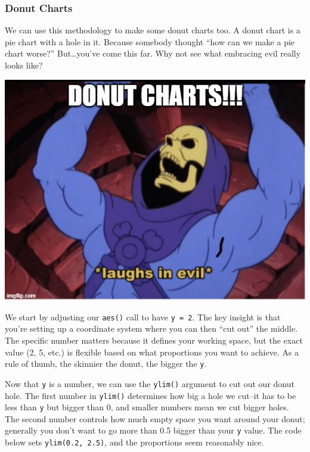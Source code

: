 \documentclass[
  letterpaper,
]{book}
\begin{document}
\subsubsection{Donut Charts}\label{donut-charts}

We can use this methodology to make some donut charts too. A donut chart
is a pie chart with a hole in it. Because somebody thought ``how can we
make a pie chart worse?'' But\ldots you've come this far. Why not see
what embracing evil really looks like?

\begin{center}
\includegraphics[width=0.6\linewidth,height=\textheight,keepaspectratio]{images/donut.jpg}
\end{center}

We start by adjusting our \texttt{aes()} call to have \texttt{y\ =\ 2}.
The key insight is that you're setting up a coordinate system where you
can then ``cut out'' the middle. The specific number matters because it
defines your working space, but the exact value (2, 5, etc.) is flexible
based on what proportions you want to achieve. As a rule of thumb, the
skinnier the donut, the bigger the \texttt{y}.

Now that \texttt{y} is a number, we can use the \texttt{ylim()} argument
to cut out our donut hole. The first number in \texttt{ylim()}
determines how big a hole we cut--it has to be less than \texttt{y} but
bigger than 0, and smaller numbers mean we cut bigger holes. The second
number controls how much empty space you want around your donut;
generally you don't want to go more than 0.5 bigger than your \texttt{y}
value. The code below sets \texttt{ylim(0.2,\ 2.5)}, and the proportions
seem reasonably nice.
\end{document}
